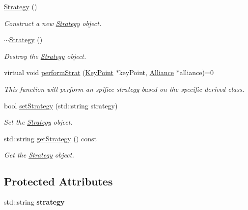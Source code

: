 \begin{DoxyCompactItemize}
\item 
\mbox{\label{classStrategy_a2021a15bbc4f0d13f7b92f8933db2235}} 
\hyperlink{classStrategy_a2021a15bbc4f0d13f7b92f8933db2235}{Strategy} ()
\begin{DoxyCompactList}\small\item\em Construct a new \hyperlink{classStrategy}{Strategy} object. \end{DoxyCompactList}\item 
\mbox{\label{classStrategy_a37c0bbdd64fd7dfcdd91578784a64775}} 
\hyperlink{classStrategy_a37c0bbdd64fd7dfcdd91578784a64775}{$\sim$\+Strategy} ()
\begin{DoxyCompactList}\small\item\em Destroy the \hyperlink{classStrategy}{Strategy} object. \end{DoxyCompactList}\item 
virtual void \hyperlink{classStrategy_aa0692005cb67d0ee2441046f6b302e7d}{perform\+Strat} (\hyperlink{classKeyPoint}{Key\+Point} $\ast$key\+Point, \hyperlink{classAlliance}{Alliance} $\ast$alliance)=0
\begin{DoxyCompactList}\small\item\em This function will perform an spifice strategy based on the specific derived class. \end{DoxyCompactList}\item 
bool \hyperlink{classStrategy_a35c4bbd2d37efaf24e21b7a0e82b4c96}{set\+Strategy} (std\+::string strategy)
\begin{DoxyCompactList}\small\item\em Set the \hyperlink{classStrategy}{Strategy} object. \end{DoxyCompactList}\item 
std\+::string \hyperlink{classStrategy_adcafe7126d3ada2f0a48ea5c3d23471c}{get\+Strategy} () const
\begin{DoxyCompactList}\small\item\em Get the \hyperlink{classStrategy}{Strategy} object. \end{DoxyCompactList}\end{DoxyCompactItemize}
\subsection*{Protected Attributes}
\begin{DoxyCompactItemize}
\item 
\mbox{\label{classStrategy_ab27bc814cf1804ca3b5fdbfb99d4a2cb}} 
std\+::string {\bfseries strategy}
\end{DoxyCompactItemize}


